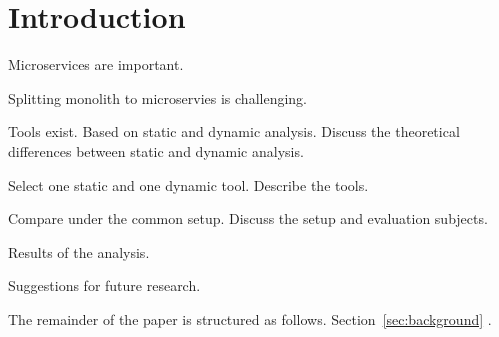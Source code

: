 \section{Introduction}
\label{sec:intro}

Microservices are important. 

Splitting monolith to microservies is challenging. 

Tools exist. Based on static and dynamic analysis. Discuss the theoretical differences between static and dynamic analysis. 

Select one static and one dynamic tool. Describe the tools. 

Compare under the common setup. Discuss the setup and evaluation subjects. 

Results of the analysis. 

Suggestions for future research. 

The remainder of the paper is structured as follows. Section~\ref{sec:background}  . 


